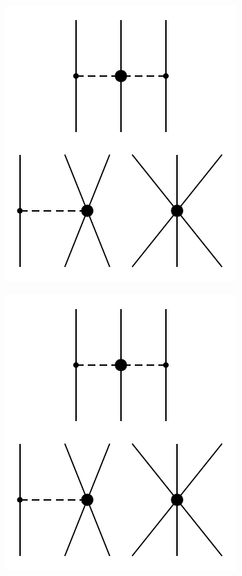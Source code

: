 \documentclass[%
 preprint,
 amsmath,amssymb,
 aps,
]{revtex4-1}
\begin{document}
\begin{figure}
\centering
\begin{subfigure}{0.25\textwidth}
\includegraphics[page=4]{Figures/3NFDiagrams}
\end{subfigure}
\begin{subfigure}{0.25\textwidth}
\includegraphics[page=3]{Figures/3NFDiagrams}
\end{subfigure}
\begin{subfigure}{0.25\textwidth}

\end{subfigure}
\end{figure}
\end{document}
